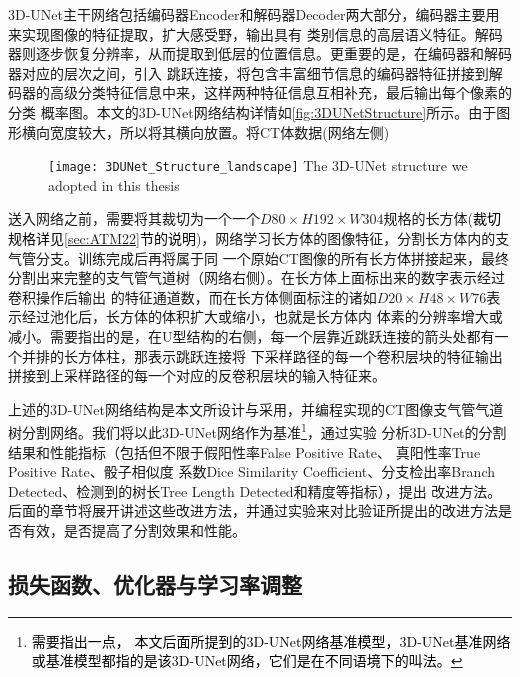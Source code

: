 3D-UNet主干网络包括编码器Encoder和解码器Decoder两大部分，编码器主要用来实现图像的特征提取，扩大感受野，输出具有
类别信息的高层语义特征。解码器则逐步恢复分辨率，从而提取到低层的位置信息。更重要的是，在编码器和解码器对应的层次之间，引入
跳跃连接，将包含丰富细节信息的编码器特征拼接到解码器的高级分类特征信息中来，这样两种特征信息互相补充，最后输出每个像素的分类
概率图。本文的3D-UNet网络结构详情如\autoref{fig:3DUNetStructure}所示。由于图形横向宽度较大，所以将其横向放置。将CT体数据(网络左侧)
\begin{figure}[!ht]
    \centering
    \texttt{[image: 3DUNet\_Structure\_landscape]}
        {The 3D-UNet structure we adopted in this thesis}
    \label{fig:3DUNetStructure}
\end{figure}
送入网络之前，需要将其裁切为一个一个$D80 \times H192 \times W304$规格的长方体(\textcolor{black}{裁切规格详见\ref{sec:ATM22}节的说明})，网络学习长方体的图像特征，分割长方体内的支气管分支。训练完成后再将属于同
一个原始CT图像的所有长方体拼接起来，最终分割出来完整的支气管气道树（网络右侧）。在长方体上面标出来的数字表示经过卷积操作后输出
的特征通道数，而在长方体侧面标注的诸如$D20 \times H48 \times W76$表示经过池化后，长方体的体积扩大或缩小，也就是长方体内
体素的分辨率增大或减小。需要指出的是，在U型结构的右侧，每一个层靠近跳跃连接的箭头处都有一个并排的长方体柱，那表示跳跃连接将
下采样路径的每一个卷积层块的特征输出拼接到上采样路径的每一个对应的反卷积层块的输入特征来。

上述的3D-UNet网络结构是本文所设计与采用，并编程实现的CT图像支气管气道树分割网络。我们将以此3D-UNet网络作为基准\footnote{\textcolor{black}{需要指出一点，
本文后面所提到的3D-UNet网络基准模型，3D-UNet基准网络或基准模型都指的是该3D-UNet网络，它们是在不同语境下的叫法。}}，通过实验
分析3D-UNet的分割结果和性能指标（包括但不限于假阳性率False Positive Rate、 真阳性率True Positive Rate、骰子相似度
系数Dice Similarity Coefficient、分支检出率Branch Detected、检测到的树长Tree Length Detected和精度等指标），提出
改进方法。后面的章节将展开讲述这些改进方法，并通过实验来对比验证所提出的改进方法是否有效，是否提高了分割效果和性能。

\subsection{损失函数、优化器与学习率调整}
